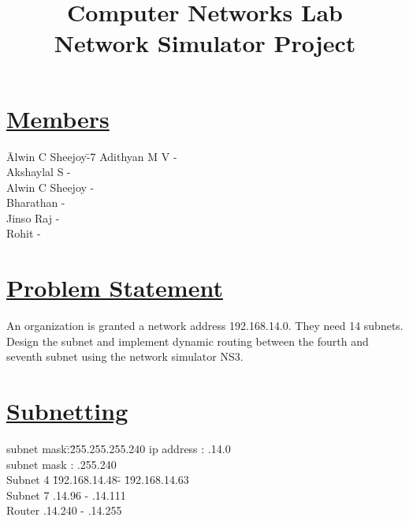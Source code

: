 \documentclass[a4paper]{report}
\title{\textbf{\Huge Computer Networks Lab\\[10pt]
Network Simulator Project}}
\date{}
\begin{document}
    \maketitle
    \oddsidemargin=0in

    \section*{\underline{Members}}
    \begin{tabbing}
        \hspace{1cm}\=Alwin C Sheejoy\quad\=-\quad\=7\kill
        \>  Adithyan M V        \>  -      \\
        \>  Akshaylal S         \>  -      \\
        \>  Alwin C Sheejoy     \>  -      \\
        \>  Bharathan           \>  -     \\
        \>  Jinso Raj           \>  -     \\
        \>  Rohit               \>  -     \\
    \end{tabbing}




    \section*{\underline{Problem Statement}}
    An organization is granted a network address 192.168.14.0. They need 14
    subnets. Design the subnet and implement dynamic routing between the
    fourth and seventh subnet using the network simulator NS3.\\




    \section*{\underline{Subnetting}}
    
    \begin{ttfamily}
        \begin{tabbing}
            subnet mask\quad\=:\quad\=255.255.255.240\kill
            ip address      \>  :   .14.0\\
            subnet mask     \>  :   .255.240\\[10pt]
            Subnet 4 \quad\= 192.168.14.48\quad\= - \quad\= 192.168.14.63\\
            Subnet 7 .14.96 \> - .14.111\\
            Router .14.240 \> - .14.255\\
        \end{tabbing}
    \end{ttfamily}
\end{document}
